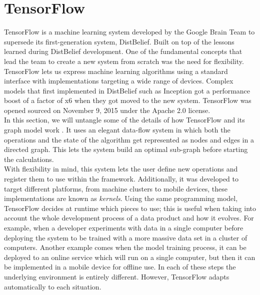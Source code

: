 \section{TensorFlow}

TensorFlow is a machine learning system developed by the Google Brain Team to supersede its first-generation system, DistBelief. Built on top of the lessons learned during DistBelief development. One of the fundamental concepts that lead the team to create a new system from scratch was the need for flexibility. TensorFlow lets us express machine learning algorithms using a standard interface with implementations targeting a wide range of devices. Complex models that first implemented in DistBelief such as Inception got a performance boost of a factor of x6 \cite{tensorflow2015-whitepaper} when they got moved to the new system. TensorFlow was opened sourced on November 9, 2015 under the Apache 2.0 license.\\ 

In this section, we will untangle some of the details of how TensorFlow and its graph model work \cite{DBLP:journals/corr/AbadiBCCDDDGIIK16}. It uses an elegant data-flow system in which both the operations and the state of the algorithm get represented as nodes and edges in a directed graph. This lets the system build an optimal sub-graph before starting the calculations.\\

With flexibility in mind, this system lets the user define new operations and register them to use within the framework. Additionally, it was developed to target different platforms, from machine clusters to mobile devices, these implementations are known as \textit{kernels}. Using the same programming model, TensorFlow decides at runtime which pieces to use; this is useful when taking into account the whole development process of a data product and how it evolves. For example, when a developer experiments with data in a single computer before deploying the system to be trained with a more massive data set in a cluster of computers. Another example comes when the model training process, it can be deployed to an online service which will run on a single computer, but then it can be implemented in a mobile device for offline use. In each of these steps the underlying environment is entirely different. However, TensorFlow adapts automatically to each situation.\\


